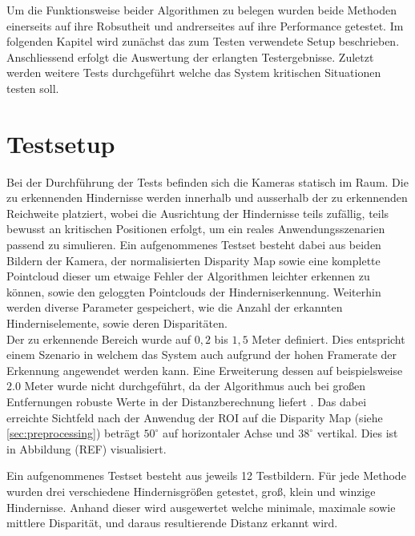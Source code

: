 Um die Funktionsweise beider Algorithmen zu belegen wurden beide Methoden einerseits auf ihre Robsutheit und andrerseites auf ihre Performance getestet. Im folgenden Kapitel wird zunächst das zum Testen verwendete Setup beschrieben. Anschliessend erfolgt die Auswertung der erlangten Testergebnisse. Zuletzt werden weitere Tests durchgeführt welche das System kritischen Situationen testen soll.

\section{Testsetup}
\label{sec:aufbau}

Bei der Durchführung der Tests befinden sich die Kameras statisch im Raum. Die zu erkennenden Hindernisse werden innerhalb und ausserhalb der zu erkennenden Reichweite platziert, wobei die Ausrichtung der Hindernisse teils zufällig, teils bewusst an kritischen Positionen erfolgt, um ein reales Anwendungsszenarien passend zu simulieren. Ein aufgenommenes Testset besteht dabei aus beiden Bildern der Kamera, der normalisierten Disparity Map sowie eine komplette Pointcloud dieser um etwaige Fehler der Algorithmen leichter erkennen zu können, sowie den geloggten Pointclouds der Hinderniserkennung. Weiterhin werden diverse Parameter gespeichert, wie die Anzahl der erkannten Hinderniselemente, sowie deren Disparitäten.\\

\noindent
Der zu erkennende Bereich wurde auf $0,2$ bis $1,5$ Meter definiert. Dies entspricht einem Szenario in welchem das System auch aufgrund der hohen Framerate der Erkennung angewendet werden kann. Eine Erweiterung dessen auf beispielsweise $2.0$ Meter wurde nicht durchgeführt, da der Algorithmus auch bei großen Entfernungen robuste Werte in der Distanzberechnung liefert \cite{hilleralhallak}.
Das dabei erreichte Sichtfeld nach der Anwendug der ROI auf die Disparity Map (siehe \ref{sec:preprocessing}) beträgt $50^{\circ}$ auf horizontaler Achse und $38^{\circ}$ vertikal. Dies ist in Abbildung (REF) visualisiert.

\noindent
Ein aufgenommenes Testset besteht aus jeweils 12 Testbildern. Für jede Methode wurden drei verschiedene Hindernisgrößen getestet, groß, klein und winzige Hindernisse. Anhand dieser wird ausgewertet welche minimale, maximale sowie mittlere Disparität, und daraus resultierende Distanz erkannt wird.\\

